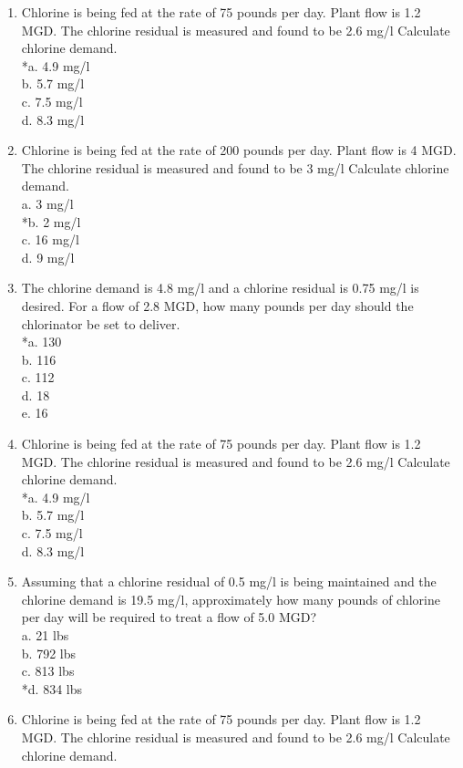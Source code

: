 \begin{enumerate}
\item Chlorine is being fed at the rate of 75 pounds per day. Plant flow is 1.2 MGD. The chlorine residual is measured and found to be 2.6 mg/l Calculate chlorine demand. \\
*a. 4.9 mg/l \\
b. 5.7 mg/l \\
c. 7.5 mg/l \\
d. 8.3 mg/l \\
\item Chlorine is being fed at the rate of 200 pounds per day. Plant flow is 4 MGD. The chlorine residual is measured and found to be 3 mg/l Calculate chlorine demand. \\
a. 3 mg/l \\
*b. 2 mg/l \\
c. 16 mg/l \\
d. 9 mg/l \\
\item The chlorine demand is 4.8 mg/l and a chlorine residual is 0.75 mg/l is desired.  For a flow of 2.8 MGD, how many pounds per day should the chlorinator be set to deliver. \\
*a. 130 \\
b. 116 \\
c. 112 \\
d. 18 \\
e. 16 \\
\item Chlorine is being fed at the rate of 75 pounds per day. Plant flow is 1.2 MGD. The chlorine residual is measured and found to be 2.6 mg/l Calculate chlorine demand. \\
*a. 4.9 mg/l \\
b. 5.7 mg/l \\
c. 7.5 mg/l \\
d. 8.3 mg/l \\
\item Assuming that a chlorine residual of 0.5 mg/l is being maintained and the chlorine demand is 19.5 mg/l, approximately how many pounds of chlorine per day will be required to treat a flow of 5.0 MGD? \\
a. 21 lbs \\
b. 792 lbs \\
c. 813 lbs \\
*d. 834 lbs \\
\item Chlorine is being fed at the rate of 75 pounds per day. Plant flow is 1.2 MGD. The chlorine residual is measured and found to be 2.6 mg/l Calculate chlorine demand. \\

\end{enumerate}
